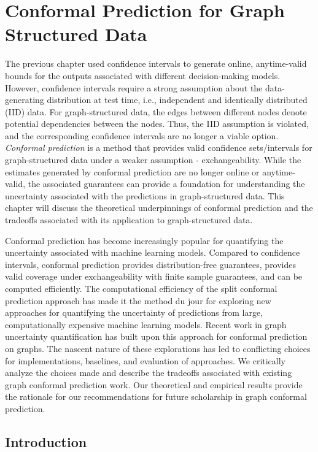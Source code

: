 \chapter{Conformal Prediction for Graph Structured Data}
\label{chp:graphConformal}
The previous chapter used confidence intervals to generate online, anytime-valid bounds for the outputs associated with different decision-making models.
However, confidence intervals require a strong assumption about the data-generating distribution at test time, i.e., independent and identically distributed (IID) data.
For graph-structured data, the edges between different nodes denote potential dependencies between the nodes.
Thus, the IID assumption is violated, and the corresponding confidence intervals are no longer a viable option.
\emph{Conformal prediction} is a method that provides valid confidence sets/intervals for graph-structured data under a weaker assumption - exchangeability.
While the estimates generated by conformal prediction are no longer online or anytime-valid, the associated guarantees can provide a foundation for understanding the uncertainty associated with the predictions in graph-structured data.
This chapter will discuss the theoretical underpinnings of conformal prediction and the tradeoffs associated with its application to graph-structured data.

Conformal prediction has become increasingly popular for quantifying the uncertainty associated with machine learning models. 
Compared to confidence intervals, conformal prediction provides distribution-free guarantees, provides valid coverage under exchangeability with finite sample guarantees, and can be computed efficiently.
The computational efficiency of the split conformal prediction approach has made it the method du jour for exploring new approaches for quantifying the uncertainty of predictions from large, computationally expensive machine learning models.
Recent work in graph uncertainty quantification has built upon this approach for conformal prediction on graphs.
The nascent nature of these explorations has led to conflicting choices for implementations, baselines, and evaluation of approaches.
We critically analyze the choices made and describe the tradeoffs associated with existing graph conformal prediction work. 
Our theoretical and empirical results provide the rationale for our recommendations for future scholarship in graph conformal prediction.

\section{Introduction}


